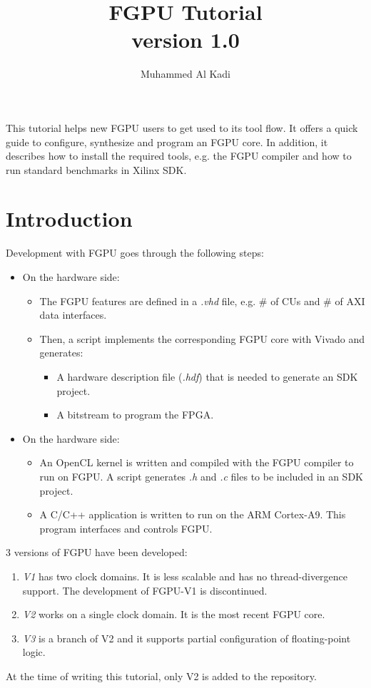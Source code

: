\documentclass[11pt]{article}
\title{FGPU Tutorial \\ \large version 1.0}
\author{Muhammed Al Kadi}
\begin{document}
\maketitle

This tutorial helps new FGPU users to get used to its tool flow.
It offers a quick guide to configure, synthesize and program an FGPU core.
In addition, it describes how to install the required tools, e.g. the FGPU compiler and how to run standard benchmarks in Xilinx SDK.
\section{Introduction}
Development with FGPU goes through the following steps:
\begin{itemize}
  \item On the hardware side:
    \begin{itemize}
      \item The FGPU features are defined in a \emph{.vhd} file, e.g. \# of CUs and \# of AXI data interfaces.
      \item Then, a script implements the corresponding FGPU core with Vivado and generates:
      \begin{itemize}
        \item A hardware description file (\emph{.hdf}) that is needed to generate an SDK project.
        \item A bitstream to program the FPGA.
      \end{itemize}
    \end{itemize}
  \item On the hardware side:
    \begin{itemize}
      \item An OpenCL kernel is written and compiled with the FGPU compiler to run on FGPU. 
        A script generates \emph{.h} and \emph{.c} files to be included in an SDK project.
      \item A C/C++ application is written to run on the ARM Cortex-A9.
      This program interfaces and controls FGPU.
    \end{itemize}
\end{itemize}

3 versions of FGPU have been developed:
\begin{enumerate}
  \item \emph{V1} has two clock domains. It is less scalable and has no thread-divergence support.
    The development of FGPU-V1 is discontinued.
  \item \emph{V2} works on a single clock domain. It is the most recent FGPU core.
  \item \emph{V3} is a branch of V2 and it supports partial configuration of floating-point logic.
\end{enumerate}
At the time of writing this tutorial, only V2 is added to the repository.
\end{document}
